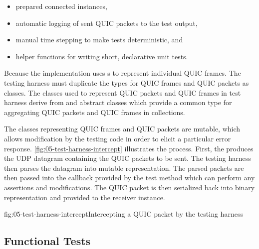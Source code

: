 \begin{itemize}

  \item prepared connected \ManagedQuicConnection{} instances,

  \item automatic logging of sent QUIC packets to the test output,

  \item manual time stepping to make tests deterministic, and

  \item helper functions for writing short, declarative unit tests.

\end{itemize}

Because the \ManagedQuicConnection{} implementation uses s to represent
individual QUIC frames. The testing harness must duplicate the types for QUIC frames and QUIC
packets as classes. The classes used to represent QUIC packets and QUIC frames in test harness
derive from  and  abstract classes which provide a common type
for aggregating QUIC packets and QUIC frames in collections.

The classes representing QUIC frames and QUIC packets are mutable, which allows modification by the
testing code in order to elicit a particular error response. \autoref{fig:05-test-harness-intercept}
illustrates the process. First, the \ManagedQuicConnection{} produces the UDP datagram containing
the QUIC packets to be sent. The testing harness then parses the datagram into mutable
representation. The parsed packets are then passed into the callback provided by the test method
which can perform any assertions and modifications. The QUIC packet is then serialized back into
binary representation and provided to the receiver \ManagedQuicConnection{} instance.


\begin{myFigure}{fig:05-test-harness-intercept}{Intercepting a QUIC packet by the testing harness}

  \resizebox{\textwidth}{!}{}

\end{myFigure}

\subsection{Functional Tests}

